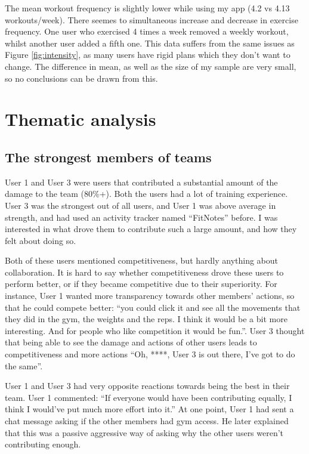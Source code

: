 \documentclass{l4proj}
\begin{document}
The mean workout frequency is slightly lower while using my app (4.2 vs 4.13 workouts/week). There seemes to simultaneous increase and decrease in exercise frequency. One user who exercised 4 times a week removed a weekly workout, whilst another user added a fifth one. This data suffers from the same issues as Figure \ref{fig:intensity}, as many users have rigid plans which they don't want to change. The difference in mean, as well as the size of my sample are very small, so no conclusions can be drawn from this.


\section{Thematic analysis}
\subsection{The strongest members of teams}
User 1 and User 3 were users that contributed a substantial amount of the damage to the team (80\%+). Both the users had a lot of training experience. User 3 was the strongest out of all users, and User 1 was above average in strength, and had used an activity tracker named ``FitNotes'' before. I was interested in what drove them to contribute such a large amount, and how they felt about doing so. 


Both of these users mentioned competitiveness, but hardly anything about collaboration. It is hard to say whether competitiveness drove these users to perform better, or if they became competitive due to their superiority. For instance, User 1 wanted more transparency towards other members' actions, so that he could compete better: ``you could click it and see all the movements that they did in the gym, the weights and the reps. I think it would be a bit more interesting. And for people who like competition it would be fun.''. User 3 thought that being able to see the damage and actions of other users leads to competitiveness and more actions ``Oh, ****, User 3 is out there, I've got to do the same''. 

User 1 and User 3 had very opposite reactions towards being the best in their team. User 1 commented: ``If everyone would have been contributing equally, I think I would've put much more effort into it.'' At one point, User 1 had sent a chat message asking if the other members had gym access. He later explained that this was a passive aggressive way of asking why the other users weren't contributing enough. 
\end{document}
